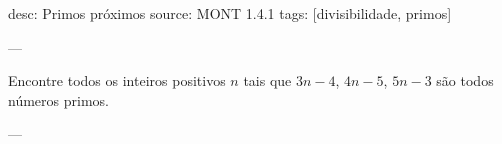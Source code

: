 desc: Primos próximos
source:  MONT 1.4.1
tags:  [divisibilidade, primos]

---

Encontre todos os inteiros positivos $n$ tais que $3n - 4$, $4n - 5$, $5n - 3$ são todos números primos.

---

